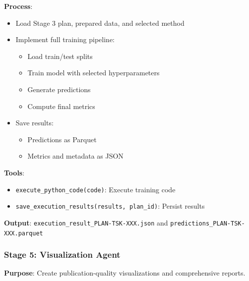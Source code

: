 \documentclass[11pt,a4paper]{article}
\begin{document}
\textbf{Process}:
\begin{itemize}
    \item Load Stage 3 plan, prepared data, and selected method
    \item Implement full training pipeline:
    \begin{itemize}
        \item Load train/test splits
        \item Train model with selected hyperparameters
        \item Generate predictions
        \item Compute final metrics
    \end{itemize}
    \item Save results:
    \begin{itemize}
        \item Predictions as Parquet
        \item Metrics and metadata as JSON
    \end{itemize}
\end{itemize}

\textbf{Tools}:
\begin{itemize}
    \item \texttt{execute\_python\_code(code)}: Execute training code
    \item \texttt{save\_execution\_results(results, plan\_id)}: Persist results
\end{itemize}

\textbf{Output}: \texttt{execution\_result\_PLAN-TSK-XXX.json} and \texttt{predictions\_PLAN-TSK-XXX.parquet}

\subsubsection{Stage 5: Visualization Agent}

\textbf{Purpose}: Create publication-quality visualizations and comprehensive reports.
\end{document}
